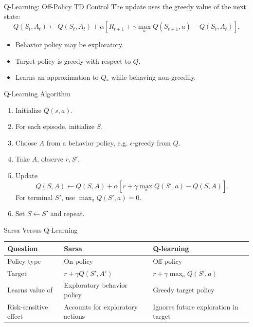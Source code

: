 \documentclass[aspectratio=169]{beamer}
\begin{document}
\begin{frame}{Q-Learning: Off-Policy TD Control}
\small
The update uses the greedy value of the next state:
\[
Q(S_t,A_t)\leftarrow Q(S_t,A_t)+\alpha
\left[
R_{t+1}+\gamma\max_{a}Q(S_{t+1},a)-Q(S_t,A_t)
\right].
\]

\vspace{0.7em}
\begin{itemize}
    \item Behavior policy may be exploratory.
    \item Target policy is greedy with respect to $Q$.
    \item Learns an approximation to $Q_*$ while behaving non-greedily.
\end{itemize}
\end{frame}

\begin{frame}{Q-Learning Algorithm}
\small
\begin{enumerate}
    \item Initialize $Q(s,a)$.
    \item For each episode, initialize $S$.
    \item Choose $A$ from a behavior policy, e.g. $\epsilon$-greedy from $Q$.
    \item Take $A$, observe $r,S'$.
    \item Update
    \[
    Q(S,A)\leftarrow Q(S,A)+\alpha[r+\gamma\max_a Q(S',a)-Q(S,A)].
    \]
    For terminal $S'$, use $\max_a Q(S',a)=0$.
    \item Set $S\leftarrow S'$ and repeat.
\end{enumerate}
\end{frame}

\begin{frame}{Sarsa Versus Q-Learning}
\small
\begin{tabular}{>{\raggedright\arraybackslash}p{}
                >{\raggedright\arraybackslash}p{}
                >{\raggedright\arraybackslash}p{}}
\toprule
Question & Sarsa & Q-learning \\
\midrule
Policy type & On-policy & Off-policy \\
Target & $r+\gamma Q(S',A')$ & $r+\gamma\max_a Q(S',a)$ \\
Learns value of & Exploratory behavior policy & Greedy target policy \\
Risk-sensitive effect & Accounts for exploratory actions & Ignores future exploration in target \\
\bottomrule
\end{tabular}
\end{frame}
\end{document}
